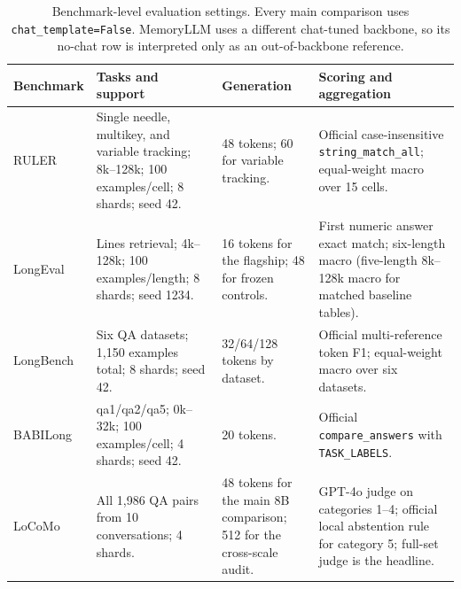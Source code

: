 \begin{table}[t]
\vspace{4pt}
\scriptsize
\renewcommand{\arraystretch}{0.92}
\setlength{\tabcolsep}{3pt}
\begin{tabular}{@{}p{}p{}p{}p{}@{}}
\toprule
\textbf{Benchmark} & \textbf{Tasks and support} & \textbf{Generation} & \textbf{Scoring and aggregation} \\
\midrule
RULER & Single needle, multikey, and variable tracking; 8k--128k; 100 examples/cell; 8 shards; seed 42. & 48 tokens; 60 for variable tracking. & Official case-insensitive \texttt{string\_match\_all}; equal-weight macro over 15 cells. \\
LongEval & Lines retrieval; 4k--128k; 100 examples/length; 8 shards; seed 1234. & 16 tokens for the flagship; 48 for frozen controls. & First numeric answer exact match; six-length macro (five-length 8k--128k macro for matched baseline tables). \\
LongBench & Six QA datasets; 1,150 examples total; 8 shards; seed 42. & 32/64/128 tokens by dataset. & Official multi-reference token F1; equal-weight macro over six datasets. \\
BABILong & qa1/qa2/qa5; 0k--32k; 100 examples/cell; 4 shards; seed 42. & 20 tokens. & Official \texttt{compare\_answers} with \texttt{TASK\_LABELS}. \\
LoCoMo & All 1,986 QA pairs from 10 conversations; 4 shards. & 48 tokens for the main 8B comparison; 512 for the cross-scale audit. & GPT-4o judge on categories 1--4; official local abstention rule for category 5; full-set judge is the headline. \\
\bottomrule
\end{tabular}
\caption{Benchmark-level evaluation settings. Every main comparison uses
\texttt{chat\_template=False}. MemoryLLM uses a different chat-tuned backbone,
so its no-chat row is interpreted only as an out-of-backbone reference.}
\label{tab:repro-eval}
\end{table}

